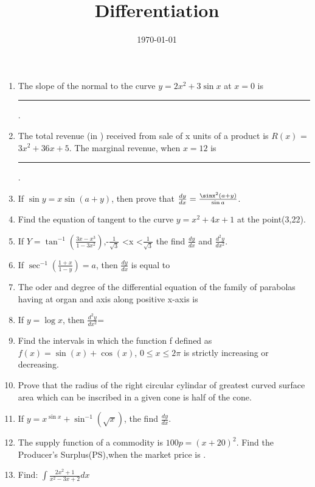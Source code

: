 \documentclass[12pt]{article}
\begin{document}
\title{\textbf{Differentiation}}
\date{\today}
\maketitle
\begin{enumerate}

\item
The slope of the normal to the curve $y=2x^2+3\sin{x}$ at $x=0$ is \rule{30pt}{1pt}.

\item
The total revenue (in \rupee) received from sale of x units of a product is $R(x)$ = $3x^2+36x+5$. The marginal revenue, when $x=12$ is \rule{30pt}{1pt}.

\item
If $\sin y = x \sin(a+y)$, then prove that $\frac {dy}{dx} = \frac {\sinx^2(a+y)}{\sin a}$.

\item
Find the equation of tangent to the curve $y=x^2+4x+1$ at the point(3,22).

\item
If $Y = \tan^{-1}\left(\frac{3x - x^3}{1 - 3x^2}\right)$,-$\frac{1}{\sqrt{3}}$ \textless x \textless $\frac{1}{\sqrt{3}}$
the find $\frac{dy}{dx}$ and $\frac{{d^2y}}{{dx^2}}$.

\item
If $\sec^{-1}\left(\frac{1+x}{1-y}\right)=a$, then $\frac{dy}{dx}$ is equal to

\item
The oder and degree of the differential equation of the family of parabolas having at 
organ and axis along positive x-axis is

\item
If $y = \log x$, then $\frac{{d^2y}}{{dx^2}}$=

\item
Find the intervals in which the function f defined as 
$f(x) = \sin(x) + \cos(x)$,
$0 \leq x \leq 2\pi$ is strictly increasing or decreasing.

\item
Prove that the radius of the right circular cylindar of greatest curved surface area which 
can be inscribed in a given cone is half of the cone.

\item
If $y=x^{\sin x }+\sin^{-1}(\sqrt x)$, the find $\frac{dy}{dx}$.

\item
The supply function of a commodity is $100p = (x+20)^2$. Find the Producer's Surplus(PS),when the market price is .

\item
Find:
$\int{\frac{2x^2 + 1}{x^2 - 3x + 2}}dx$


\end{enumerate}
\end{document}
